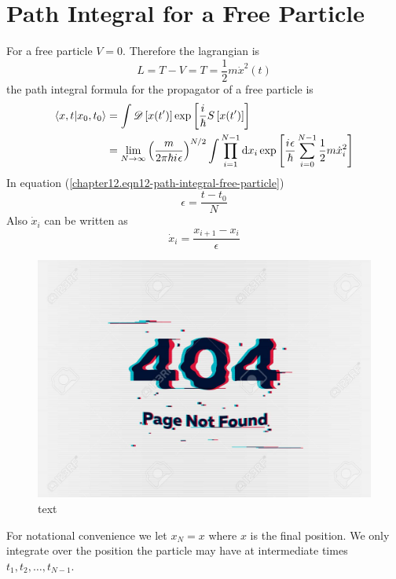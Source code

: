 	\section{Path Integral for a Free Particle}
	For a free particle $V=0$. Therefore the lagrangian is
	\begin{equation}
		L = T - V = T = \frac{1}{2} m \dot{x}^2(t)
		\label{chapter12.eqn11-path-integral-free-particle}
	\end{equation}
	the path integral formula for the propagator of a free particle is
	\begin{align}
		\braket{x, t}{x_0, t_0} 
		&= \int \mathcal{D}\left[x(t^\prime)\right] \exp\left[\frac{{i\mkern1mu}}{\hbar} S\left[x(t^\prime)\right]\right] \\
		&= \lim\limits_{N \rightarrow \infty} \left(\frac{m}{2 \pi \hbar {i\mkern1mu} \epsilon}\right)^{N/2} \int \prod_{i=1}^{N-1} \dd{x_i} \exp\left[\frac{{i\mkern1mu} \epsilon}{\hbar} \sum_{i=0}^{N-1} \frac{1}{2} m \dot{x}_i^2\right]
		\label{chapter12.eqn12-path-integral-free-particle}
	\end{align}
	In equation (\ref{chapter12.eqn12-path-integral-free-particle})
	\begin{equation}
		\epsilon = \frac{t - t_0}{N}
	\end{equation}
	Also $\dot{x}_i$ can be written as
	\begin{equation}
		\dot{x}_i = \frac{x_{i+1} - x_i}{\epsilon}
		\label{chapter12.eqn13-path-integral-free-particle}
	\end{equation}
	
	\begin{figure}
		\centering
		\includegraphics[width=0.5\linewidth]{Pictures/not-found.jpg}
		\caption{text}
		\label{chapter12.fig2}
	\end{figure}
	For notational convenience we let $x_N = x$ where $x$ is the final position. We only integrate over the position the particle may have at intermediate times $t_1, t_2, \ldots, t_{N-1}$.\\
	
